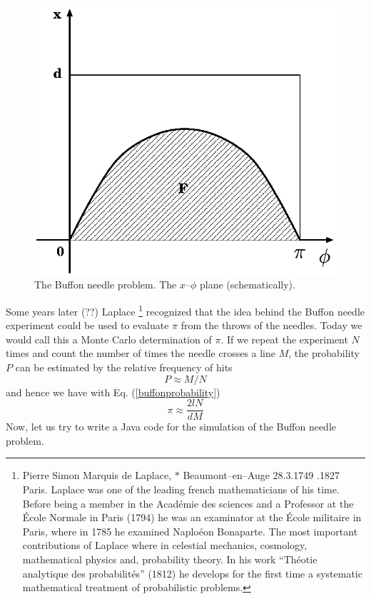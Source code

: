 \begin{figure}
\label{buffonplane}
\includegraphics[width=.8\textwidth]{Figures/buffonplane.eps}
\caption{The Buffon needle problem. The $x$--$\phi$ plane (schematically).}
\end{figure}

Some years later (??) Laplace 
\footnote{Pierre Simon Marquis de Laplace, $\ast$ Beaumont--en--Auge
  28.3.1749 .1827 Paris. Laplace was one of the leading french
  mathematicians of his time. Before being a member in the Acad\'emie
  des sciences and a Professor at the \'Ecole Normale in Paris (1794)
he was an examinator at the \'Ecole militaire in Paris, where in 1785
he examined Naplo\'eon Bonaparte. The most important contributions of
Laplace where in celestial mechanics, cosmology, mathematical physics
and, probability theory. In his work ``Th\'eotie analytique des
probabilit\'es'' (1812) he develops  for the first time a systematic
mathematical treatment of probabilistic problems.} recognized that
the idea behind the Buffon needle experiment could be used to evaluate
$\pi$ from the throws of the needles. Today we would call this a
Monte Carlo determination of $\pi$. If we repeat the experiment $N$
times and count the number of times the needle crosses a line $M$, the
probability $P$ can be estimated by the relative frequency of hits
\begin{equation}
\label{buffonestimateP}
P \approx M/N
\end{equation}
and hence we have with Eq. (\ref{buffonprobability})
\begin{equation}
\pi \approx \frac{2lN}{dM}
\end{equation}
Now, let us try to write a Java code for the simulation of the Buffon
needle problem.

